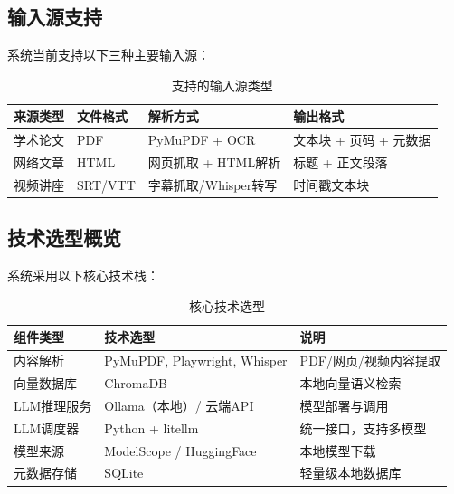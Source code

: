 \documentclass[12pt,a4paper,oneside]{article}
\begin{document}
\subsection{输入源支持}

系统当前支持以下三种主要输入源：

\begin{table}[h]
    \centering
    \caption{支持的输入源类型}
    \begin{tabular}{p{2.5cm}p{3cm}p{4cm}p{2.5cm}}
        \toprule
        \textbf{来源类型} & \textbf{文件格式} & \textbf{解析方式} & \textbf{输出格式} \\
        \midrule
        学术论文 & PDF & PyMuPDF + OCR & 文本块 + 页码 + 元数据 \\
        网络文章 & HTML & 网页抓取 + HTML解析 & 标题 + 正文段落 \\
        视频讲座 & SRT/VTT & 字幕抓取/Whisper转写 & 时间戳文本块 \\
        \bottomrule
    \end{tabular}
\end{table}

\subsection{技术选型概览}

系统采用以下核心技术栈：

\begin{table}[h]
    \centering
    \caption{核心技术选型}
    \begin{tabular}{p{3cm}p{4cm}p{4cm}}
        \toprule
        \textbf{组件类型} & \textbf{技术选型} & \textbf{说明} \\
        \midrule
        内容解析 & PyMuPDF, Playwright, Whisper & PDF/网页/视频内容提取 \\
        向量数据库 & ChromaDB & 本地向量语义检索 \\
        LLM推理服务 & Ollama（本地）/ 云端API & 模型部署与调用 \\
        LLM调度器 & Python + litellm & 统一接口，支持多模型 \\
        模型来源 & ModelScope / HuggingFace & 本地模型下载 \\
        元数据存储 & SQLite & 轻量级本地数据库 \\
        \bottomrule
    \end{tabular}
\end{table}

\newpage

\end{document}
